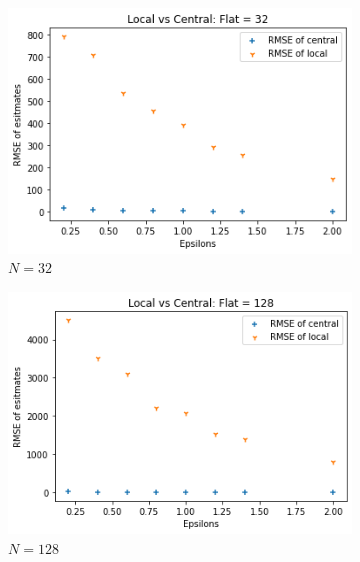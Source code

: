 \documentclass[11pt]{article}
\theoremstyle{definition}
\begin{document}
\begin{figure}[H]
\centering
\begin{subfigure}{.3\textwidth}
  \centering
  \includegraphics[width=\linewidth]{figures/cen_vs_loc/flat/flat_N=32.png}
  \caption{$N=32$}
  \label{fig:cen_vs32}
\end{subfigure}%
\begin{subfigure}{.3\textwidth}
  \centering
  \includegraphics[width=\linewidth]{figures/cen_vs_loc/flat/flat_N=128.png}
  \caption{$N=128$}
  \label{fig:cen_vs256}
\end{subfigure}%
\begin{subfigure}{.3\textwidth}
  \centering

\end{subfigure}
\end{figure}
\end{document}
